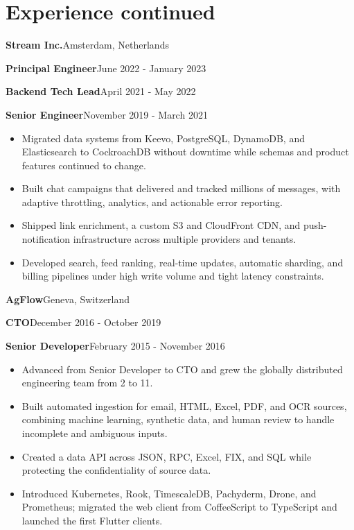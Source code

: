 \documentclass[11pt,a4paper]{article}
\begin{document}
\newpage

\section{Experience continued}

\vspace{4pt}
{\large\bfseries\color{ink}Stream Inc.}\hfill{\small\color{muted}Amsterdam, Netherlands}\par
{\bfseries\color{accent}Principal Engineer}\hfill{\small\color{muted}June 2022 - January 2023}\par
{\bfseries\color{accent}Backend Tech Lead}\hfill{\small\color{muted}April 2021 - May 2022}\par
{\bfseries\color{accent}Senior Engineer}\hfill{\small\color{muted}November 2019 - March 2021}\par
\begin{itemize}
  \item Migrated data systems from Keevo, PostgreSQL, DynamoDB, and Elasticsearch to CockroachDB without downtime while schemas and product features continued to change.
  \item Built chat campaigns that delivered and tracked millions of messages, with adaptive throttling, analytics, and actionable error reporting.
  \item Shipped link enrichment, a custom S3 and CloudFront CDN, and push-notification infrastructure across multiple providers and tenants.
  \item Developed search, feed ranking, real-time updates, automatic sharding, and billing pipelines under high write volume and tight latency constraints.
\end{itemize}

{\large\bfseries\color{ink}AgFlow}\hfill{\small\color{muted}Geneva, Switzerland}\par
{\bfseries\color{accent}CTO}\hfill{\small\color{muted}December 2016 - October 2019}\par
{\bfseries\color{accent}Senior Developer}\hfill{\small\color{muted}February 2015 - November 2016}\par
\begin{itemize}
  \item Advanced from Senior Developer to CTO and grew the globally distributed engineering team from 2 to 11.
  \item Built automated ingestion for email, HTML, Excel, PDF, and OCR sources, combining machine learning, synthetic data, and human review to handle incomplete and ambiguous inputs.
  \item Created a data API across JSON, RPC, Excel, FIX, and SQL while protecting the confidentiality of source data.
  \item Introduced Kubernetes, Rook, TimescaleDB, Pachyderm, Drone, and Prometheus; migrated the web client from CoffeeScript to TypeScript and launched the first Flutter clients.
\end{itemize}
\end{document}

